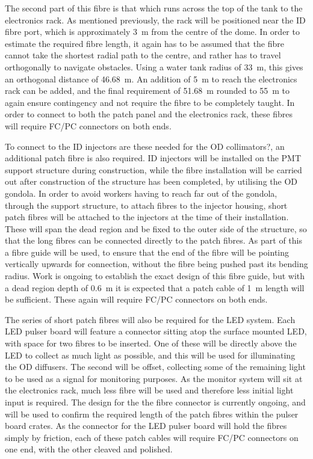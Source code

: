 \documentclass[a4paper,11pt]{article}
\begin{document}
The second part of this fibre is that which runs across the top of the tank to the electronics rack. As mentioned previously, the rack will be positioned near the ID fibre port, which is approximately 3~m from the centre of the dome. In order to estimate the required fibre length, it again has to be assumed that the fibre cannot take the shortest radial path to the centre, and rather has to travel orthogonally to navigate obstacles. Using a water tank radius of 33~m, this gives an orthogonal distance of 46.68~m. An addition of 5~m to reach the electronics rack can be added, and the final requirement of 51.68~m rounded to 55~m to again ensure contingency and not require the fibre to be completely taught. In order to connect to both the patch panel and the electronics rack, these fibres will require FC/PC connectors on both ends.

To connect to the ID injectors {\color{red}are these needed for the OD collimators?}, an additional patch fibre is also required. ID injectors will be installed on the PMT support structure during construction, while the fibre installation will be carried out after construction of the structure has been completed, by utilising the OD gondola. In order to avoid workers having to reach far out of the gondola, through the support structure, to attach fibres to the injector housing, short patch fibres will be attached to the injectors at the time of their installation. These will span the dead region and be fixed to the outer side of the structure, so that the long fibres can be connected directly to the patch fibres. As part of this a fibre guide will be used, to ensure that the end of the fibre will be pointing vertically upwards for connection, without the fibre being pushed past its bending radius. {\color{red} Work is ongoing to establish the exact design of this fibre guide, but with a dead region depth of 0.6~m it is expected that a patch cable of 1~m length will be sufficient. These again will require FC/PC connectors on both ends.}

The series of short patch fibres will also be required for the LED system. Each LED pulser board will feature a connector sitting atop the surface mounted LED, with space for two fibres to be inserted. One of these will be directly above the LED to collect as much light as possible, and this will be used for illuminating the OD diffusers. The second will be offset, collecting some of the remaining light to be used as a signal for monitoring purposes. As the monitor system will sit at the electronics rack, much less fibre will be used and therefore less initial light input is required. {\color{red} The design for the the fibre connector is currently ongoing, and will be used to confirm the required length of the patch fibres within the pulser board crates.} As the connector for the LED pulser board will hold the fibres simply by friction, each of these patch cables will require FC/PC connectors on one end, with the other cleaved and polished.
\end{document}

